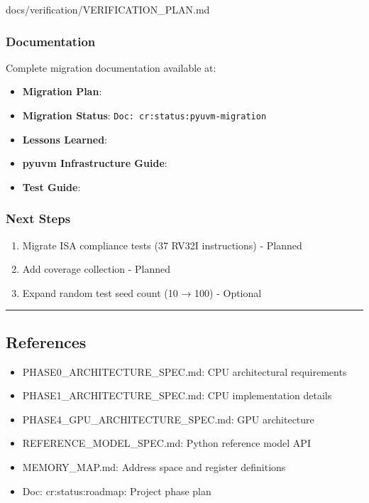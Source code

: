 \begin{relocated}{docs/verification/VERIFICATION_PLAN.md}
\subsubsection{Documentation}\label{ds:ch:verification-plan:documentation}

Complete migration documentation available at:

\begin{itemize}
\tightlist
\item
  \textbf{Migration Plan}: 
\item
  \textbf{Migration Status}:
  \texttt{Doc:\allowbreak{}\ cr:\allowbreak{}status:\allowbreak{}pyuvm-\allowbreak{}migration}
\item
  \textbf{Lessons Learned}:
\item
  \textbf{pyuvm Infrastructure Guide}: 
\item
  \textbf{Test Guide}: 
\end{itemize}

\subsubsection{Next Steps}\label{ds:ch:verification-plan:next-steps}

\begin{enumerate}
\def\labelenumi{\arabic{enumi}.}
\tightlist
\item
  Migrate ISA compliance tests (37 RV32I instructions) - Planned
\item
  Add coverage collection - Planned
\item
  Expand random test seed count (10 → 100) - Optional
\end{enumerate}

\begin{center}\rule{0.5\linewidth}{0.5pt}\end{center}

\subsection{References}\label{ds:ch:verification-plan:references}

\begin{itemize}
\tightlist
\item
  PHASE0\_\allowbreak{}ARCHITECTURE\_\allowbreak{}SPEC.md: CPU
  architectural requirements
\item
  PHASE1\_\allowbreak{}ARCHITECTURE\_\allowbreak{}SPEC.md: CPU
  implementation details
\item
  PHASE4\_\allowbreak{}GPU\_\allowbreak{}ARCHITECTURE\_\allowbreak{}SPEC.md:
  GPU architecture
\item
  REFERENCE\_\allowbreak{}MODEL\_\allowbreak{}SPEC.md: Python reference
  model API
\item
  MEMORY\_\allowbreak{}MAP.md: Address space and register definitions
\item
  Doc: cr:status:roadmap: Project phase plan
\end{itemize}
\end{relocated}

